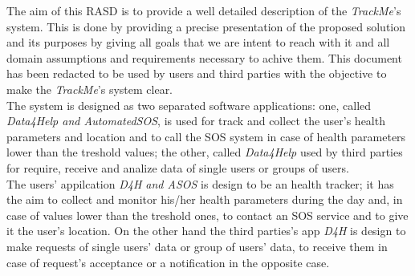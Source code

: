 The aim of this RASD is to provide a well detailed description of the \textit{TrackMe}'s system.
This is done by providing a precise presentation of the proposed solution and its purposes by giving all goals that we are intent to reach with it and all domain assumptions and requirements necessary to achive them.
This document has been redacted to be used by users and third parties with the objective to make the \textit{TrackMe}'s system clear.\vspace{0.5cm}\\The system is designed as two separated software applications: one, called \textit{Data4Help and AutomatedSOS}, is used for track and collect the user's health parameters and location and to call the SOS system in case of health parameters lower than the treshold values; the other, called \textit{Data4Help} used by third parties for require, receive and analize data of single users or groups of users.\\
The users' appilcation \textit{D4H and ASOS} is design to be an health tracker; it has the aim to collect and monitor his/her health parameters during the day and, in case of values lower than the treshold ones, to contact an SOS service and to give it the user's location. On the other hand the third parties's app \textit{D4H} is design to make requests of single users' data or group of users' data, to receive them in case of request's acceptance or a notification in the opposite case.